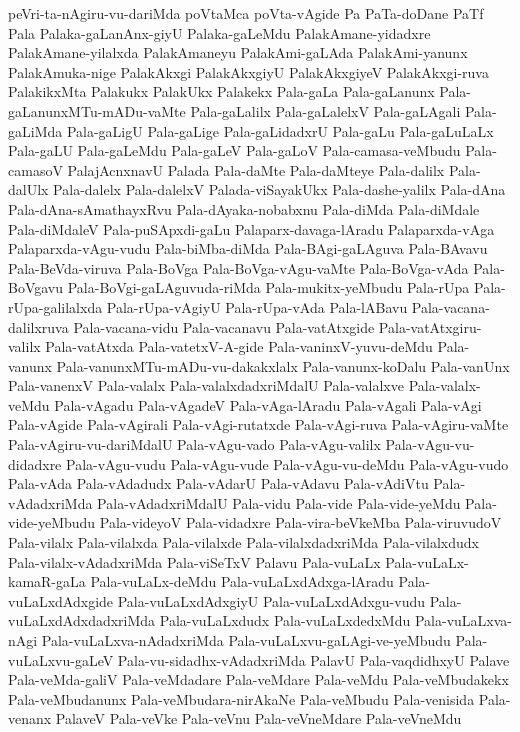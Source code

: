 {peVri-ta-nAgiru-vu-dariMda
poVtaMca
poVta-vAgide
Pa
PaTa-doDane
PaTf
Pala
Palaka-gaLanAnx-giyU
Palaka-gaLeMdu
PalakAmane-yidadxre
PalakAmane-yilalxda
PalakAmaneyu
PalakAmi-gaLAda
PalakAmi-yanunx
PalakAmuka-nige
PalakAkxgi
PalakAkxgiyU
PalakAkxgiyeV
PalakAkxgi-ruva
PalakikxMta
Palakukx
PalakUkx
Palakekx
Pala-gaLa
Pala-gaLanunx
Pala-gaLanunxMTu-mADu-vaMte
Pala-gaLalilx
Pala-gaLalelxV
Pala-gaLAgali
Pala-gaLiMda
Pala-gaLigU
Pala-gaLige
Pala-gaLidadxrU
Pala-gaLu
Pala-gaLuLaLx
Pala-gaLU
Pala-gaLeMdu
Pala-gaLeV
Pala-gaLoV
Pala-camasa-veMbudu
Pala-camasoV
PalajAcnxnavU
Palada
Pala-daMte
Pala-daMteye
Pala-dalilx
Pala-dalUlx
Pala-dalelx
Pala-dalelxV
Palada-viSayakUkx
Pala-dashe-yalilx
Pala-dAna
Pala-dAna-sAmathayxRvu
Pala-dAyaka-nobabxnu
Pala-diMda
Pala-diMdale
Pala-diMdaleV
Pala-puSApxdi-gaLu
Palaparx-davaga-lAradu
Palaparxda-vAga
Palaparxda-vAgu-vudu
Pala-biMba-diMda
Pala-BAgi-gaLAguva
Pala-BAvavu
Pala-BeVda-viruva
Pala-BoVga
Pala-BoVga-vAgu-vaMte
Pala-BoVga-vAda
Pala-BoVgavu
Pala-BoVgi-gaLAguvuda-riMda
Pala-mukitx-yeMbudu
Pala-rUpa
Pala-rUpa-galilalxda
Pala-rUpa-vAgiyU
Pala-rUpa-vAda
Pala-lABavu
Pala-vacana-dalilxruva
Pala-vacana-vidu
Pala-vacanavu
Pala-vatAtxgide
Pala-vatAtxgiru-valilx
Pala-vatAtxda
Pala-vatetxV-A-gide
Pala-vaninxV-yuvu-deMdu
Pala-vanunx
Pala-vanunxMTu-mADu-vu-dakakxlalx
Pala-vanunx-koDalu
Pala-vanUnx
Pala-vanenxV
Pala-valalx
Pala-valalxdadxriMdalU
Pala-valalxve
Pala-valalx-veMdu
Pala-vAgadu
Pala-vAgadeV
Pala-vAga-lAradu
Pala-vAgali
Pala-vAgi
Pala-vAgide
Pala-vAgirali
Pala-vAgi-rutatxde
Pala-vAgi-ruva
Pala-vAgiru-vaMte
Pala-vAgiru-vu-dariMdalU
Pala-vAgu-vado
Pala-vAgu-valilx
Pala-vAgu-vu-didadxre
Pala-vAgu-vudu
Pala-vAgu-vude
Pala-vAgu-vu-deMdu
Pala-vAgu-vudo
Pala-vAda
Pala-vAdadudx
Pala-vAdarU
Pala-vAdavu
Pala-vAdiVtu
Pala-vAdadxriMda
Pala-vAdadxriMdalU
Pala-vidu
Pala-vide
Pala-vide-yeMdu
Pala-vide-yeMbudu
Pala-videyoV
Pala-vidadxre
Pala-vira-beVkeMba
Pala-viruvudoV
Pala-vilalx
Pala-vilalxda
Pala-vilalxde
Pala-vilalxdadxriMda
Pala-vilalxdudx
Pala-vilalx-vAdadxriMda
Pala-viSeTxV
Palavu
Pala-vuLaLx
Pala-vuLaLx-kamaR-gaLa
Pala-vuLaLx-deMdu
Pala-vuLaLxdAdxga-lAradu
Pala-vuLaLxdAdxgide
Pala-vuLaLxdAdxgiyU
Pala-vuLaLxdAdxgu-vudu
Pala-vuLaLxdAdxdadxriMda
Pala-vuLaLxdudx
Pala-vuLaLxdedxMdu
Pala-vuLaLxva-nAgi
Pala-vuLaLxva-nAdadxriMda
Pala-vuLaLxvu-gaLAgi-ve-yeMbudu
Pala-vuLaLxvu-gaLeV
Pala-vu-sidadhx-vAdadxriMda
PalavU
Pala-vaqdidhxyU
Palave
Pala-veMda-galiV
Pala-veMdadare
Pala-veMdare
Pala-veMdu
Pala-veMbudakekx
Pala-veMbudanunx
Pala-veMbudara-nirAkaNe
Pala-veMbudu
Pala-venisida
Pala-venanx
PalaveV
Pala-veVke
Pala-veVnu
Pala-veVneMdare
Pala-veVneMdu
}
